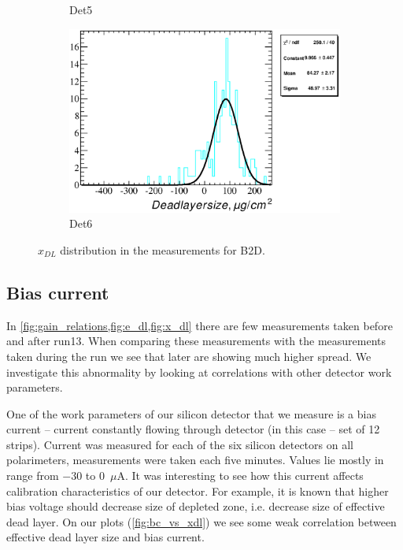 \documentclass[a4paper,12pt]{article}
\begin{document}
\begin{figure}
\begin{subfigure}[b]{0.325\textwidth}
\caption{Det5}
\end{subfigure}
\hfill
\begin{subfigure}[b]{0.325\textwidth}
\includegraphics[width=\textwidth]{gfx/run13_alpha_study_novoltagevariation/B2D/c_hDeadLayerSize_by_run_distribution6_B2D.eps}
\caption{Det6}
\end{subfigure}
\caption{$x_{DL}$ distribution in the measurements for B2D.}
\end{figure}

\subsection{Bias current}


In \cref{fig:gain_relations,fig:e_dl,fig:x_dl} there are few measurements taken
before and after run13. When comparing these measurements with the measurements
taken during the run we see that later are showing much higher spread.  We
investigate this abnormality by looking at correlations with other
detector work parameters.

One of the work parameters of our silicon detector that we measure is a bias
current -- current constantly flowing through detector (in this case -- set of
12 strips). Current was measured for each of the six silicon detectors on all
polarimeters, measurements were taken each five minutes. Values lie mostly in
range from $-30$ to $0$~$\mu\text{A}$. It was interesting to see how this current
affects calibration characteristics of our detector. For example, it is known
that higher bias voltage should decrease size of depleted zone, i.e. decrease
size of effective dead layer. On our plots (\cref{fig:bc_vs_xdl}) we see some weak
correlation between effective dead layer size and bias current.
\end{document}
